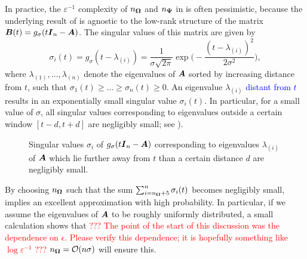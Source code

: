 In practice, the $\varepsilon^{-1}$ complexity of $n_{\boldsymbol{\Omega}}$ and $n_{\boldsymbol{\Psi}}$ in  is often pessimistic, because  the underlying result of  is agnostic to the low-rank structure of the matrix $\boldsymbol{B}(t) = g_{\sigma}(t\boldsymbol{I}_n - \boldsymbol{A})$. The singular values of this matrix are given by
\begin{equation}
    \sigma_i(t) = g_{\sigma}(t - \lambda_{(i)}) = \frac{1}{\sigma\sqrt{2 \pi}} \exp\Big( -\frac{(t - \lambda_{(i)})^2}{2 \sigma^2} \Big),  
    \label{equ:gaussian-kernel-eigenvalues}
\end{equation}
where $\lambda_{(1)}, \dots, \lambda_{(n)}$ denote the eigenvalues of $\boldsymbol{A}$ sorted by increasing distance from $t$, such that $\sigma_1(t) \geq \dots \geq \sigma_n(t) \ge 0$. An eigenvalue $\lambda_{(i)}$ \textcolor{blue}{distant from $t$} results in an exponentially small singular value $\sigma_i(t)$. In particular, for a small value of $\sigma$, all singular values corresponding to eigenvalues outside a certain window $[t - d, t + d]$ are negligibly small; see ).
\begin{figure}[ht]
    \centering
    
    \caption{Singular values $\sigma_i$ of $g_{\sigma}(t\boldsymbol{I}_n - \boldsymbol{A})$ corresponding to eigenvalues $\lambda_{(i)}$ of $\boldsymbol{A}$ which lie further away from $t$ than a certain distance $d$ are negligibly small.}
    \label{fig:numerical-rank}
\end{figure}
By choosing $n_{\boldsymbol{\Omega}}$ such that the sum $\sum_{i=n_{\boldsymbol{\Omega}}+5}^{n} \sigma_i(t)$ becomes negligibly small,   implies an excellent approximation with high probability. In particular, if we assume the eigenvalues of $\boldsymbol{A}$ to be roughly uniformly distributed, a small calculation shows that \textcolor{red}{??? The point of the start of this discussion was the dependence on $\epsilon$. Please verify this dependence; it is hopefully something like $\log\varepsilon^{-1}$ ???} $n_{\boldsymbol{\Omega}} = \mathcal{O}(n \sigma)$ will ensure this.

